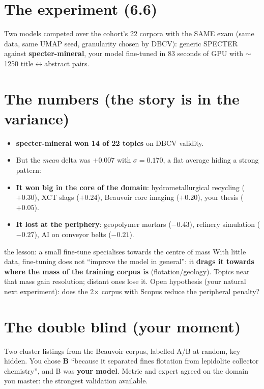 \documentclass[11pt,a4paper]{article}
\begin{document}

\section{The experiment (6.6)}

Two models competed over the cohort's 22 corpora with the SAME exam (same data, same UMAP seed,
granularity chosen by DBCV): generic SPECTER against \textbf{specter-mineral}, your model
fine-tuned in 83 seconds of GPU with $\sim$1250 title$\leftrightarrow$abstract pairs.

\section{The numbers (the story is in the variance)}

\begin{itemize}
  \item \textbf{specter-mineral won 14 of 22 topics} on DBCV validity.
  \item But the \emph{mean} delta was $+0.007$ with $\sigma = 0.170$, a flat average hiding a
        strong pattern:
  \item \textbf{It won big in the core of the domain}: hydrometallurgical recycling ($+0.30$),
        XCT slags ($+0.24$), Beauvoir core imaging ($+0.20$), your thesis ($+0.05$).
  \item \textbf{It lost at the periphery}: geopolymer mortars ($-0.43$), refinery simulation
        ($-0.27$), AI on conveyor belts ($-0.21$).
\end{itemize}

\begin{concepto}{the lesson: a small fine-tune specialises towards the centre of mass}
With little data, fine-tuning does not ``improve the model in general'': it \textbf{drags it
towards where the mass of the training corpus is} (flotation/geology). Topics near that mass
gain resolution; distant ones lose it. Open hypothesis (your natural next experiment): does the
2$\times$ corpus with Scopus reduce the peripheral penalty?
\end{concepto}

\section{The double blind (your moment)}

Two cluster listings from the Beauvoir corpus, labelled A/B at random, key hidden. You chose
\textbf{B} ``because it separated fines flotation from lepidolite collector chemistry'', and B
was \textbf{your model}. Metric and expert agreed on the domain you master: the strongest
validation available.
\end{document}
